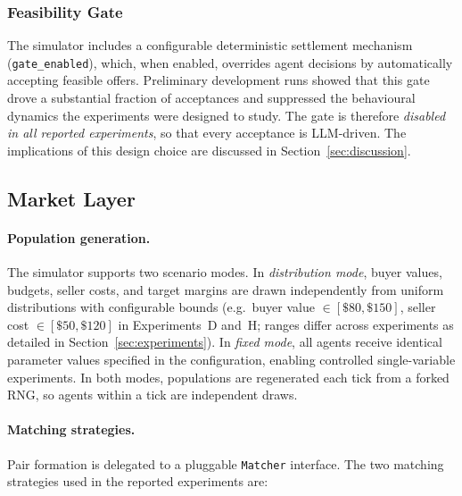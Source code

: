\subsubsection{Feasibility Gate}
\label{sec:gate}

The simulator includes a configurable deterministic settlement mechanism (\texttt{gate\_enabled}), which, when enabled, overrides agent decisions by automatically accepting feasible offers.  Preliminary development runs showed that this gate drove a substantial fraction of acceptances and suppressed the behavioural dynamics the experiments were designed to study.  The gate is therefore \emph{disabled in all reported experiments}, so that every acceptance is LLM-driven.  The implications of this design choice are discussed in Section~\ref{sec:discussion}.

\subsection{Market Layer}
\label{sec:market}

\paragraph{Population generation.}
The simulator supports two scenario modes.  In \emph{distribution mode}, buyer values, budgets, seller costs, and target margins are drawn independently from uniform distributions with configurable bounds (e.g.\ buyer value $\in [\$80, \$150]$, seller cost $\in [\$50, \$120]$ in Experiments~D and~H; ranges differ across experiments as detailed in Section~\ref{sec:experiments}).  In \emph{fixed mode}, all agents receive identical parameter values specified in the configuration, enabling controlled single-variable experiments.  In both modes, populations are regenerated each tick from a forked RNG, so agents within a tick are independent draws.

\paragraph{Matching strategies.}
\label{sec:matching}
Pair formation is delegated to a pluggable \texttt{Matcher} interface.  The two matching strategies used in the reported experiments are:


